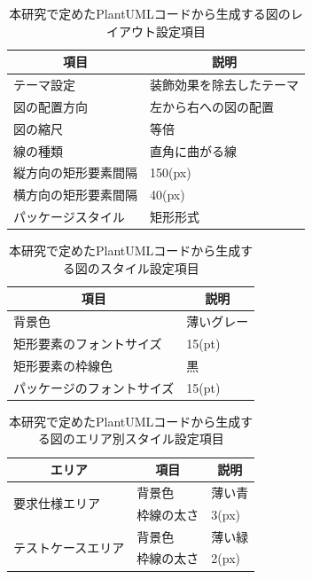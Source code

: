 \begin{table}[tp]
    \caption{本研究で定めたPlantUMLコードから生成する図のレイアウト設定項目}\label{tab:puml-layout-settings}
    \centering
    \begin{tabular}{l|l}
        \multicolumn{1}{c|}{項目} & \multicolumn{1}{c}{説明} \\
        \hline
        \hline
        テーマ設定 & 装飾効果を除去したテーマ \\
        \hline
        図の配置方向 & 左から右への図の配置 \\
        \hline
        図の縮尺 & 等倍 \\
        \hline
        線の種類 & 直角に曲がる線 \\
        \hline
        縦方向の矩形要素間隔 & 150(px) \\
        \hline
        横方向の矩形要素間隔 & 40(px) \\
        \hline
        パッケージスタイル & 矩形形式 \\
        \hline
    \end{tabular}
\end{table}

\begin{table}[tp]
    \caption{本研究で定めたPlantUMLコードから生成する図のスタイル設定項目}\label{tab:puml-style-settings}
    \centering
    \begin{tabular}{l|l}
        \multicolumn{1}{c|}{項目} & \multicolumn{1}{c}{説明} \\
        \hline
        \hline
        背景色 & 薄いグレー \\
        \hline
        矩形要素のフォントサイズ & 15(pt) \\
        \hline
        矩形要素の枠線色 & 黒 \\
        \hline
        パッケージのフォントサイズ & 15(pt) \\
        \hline
    \end{tabular}
\end{table}

\begin{table}[tp]
    \caption{本研究で定めたPlantUMLコードから生成する図のエリア別スタイル設定項目}\label{tab:puml-area-settings}
    \centering
    \begin{tabular}{l|l|l}
        \multicolumn{1}{c|}{エリア} & \multicolumn{1}{c|}{項目} & \multicolumn{1}{c}{説明} \\
        \hline
        \hline
        \multirow{2}{*}{要求仕様エリア} & 背景色 & 薄い青 \\
        \cline{2-3}
        & 枠線の太さ & 3(px) \\
        \hline
        \multirow{2}{*}{テストケースエリア} & 背景色 & 薄い緑 \\
        \cline{2-3}
        & 枠線の太さ & 2(px) \\
        \hline
    \end{tabular}
\end{table}

